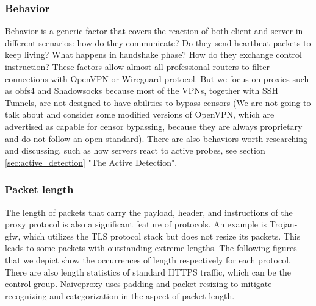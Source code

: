 \documentclass[conference]{IEEEtran}
\begin{document}
\subsubsection{Behavior}
Behavior is a generic factor that covers the reaction of both client and server in different scenarios: how do they communicate? Do they send heartbeat packets to keep living? What happens in handshake phase? How do they exchange control instruction? These factors allow almost all professional routers to filter connections with OpenVPN or Wireguard protocol. But we focus on proxies such as obfs4 and Shadowsocks because most of the VPNs, together with SSH Tunnels, are not designed to have abilities to bypass censors (We are not going to talk about and consider some modified versions of OpenVPN, which are advertised as capable for censor bypassing, because they are always proprietary and do not follow an open standard). There are also behaviors worth researching and discussing, such as how servers react to active probes, see section \ref{sec:active_detection} "The Active Detection".

\subsubsection{Packet length}
The length of packets that carry the payload, header, and instructions of the proxy protocol is also a significant feature of protocols. An example is Trojan-gfw, which utilizes the TLS protocol stack but does not resize its packets. This leads to some packets with outstanding extreme lengths. 
The following figures that we depict show the occurrences of length respectively for each protocol. 
There are also length statistics of standard HTTPS traffic, which can be the control group. Naiveproxy uses padding and packet resizing to mitigate recognizing and categorization in the aspect of packet length. 


\end{document}
